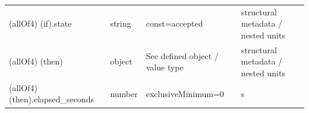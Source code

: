 \begin{longtable}{@{}>{\raggedright\arraybackslash}p{}>{\raggedright\arraybackslash}p{}>{\raggedright\arraybackslash}p{}>{\raggedright\arraybackslash}p{}@{}}
 (allOf4) (if).\allowbreak{}state & string & const=\allowbreak{}accepted & structural metadata /\allowbreak{} nested units\\
 (allOf4) (then) & object & See defined object /\allowbreak{} value type & structural metadata /\allowbreak{} nested units\\
 (allOf4) (then).\allowbreak{}elapsed\_\allowbreak{}seconds & number & exclusiveMinimum=\allowbreak{}0 & s\\
\end{longtable}\endgroup
